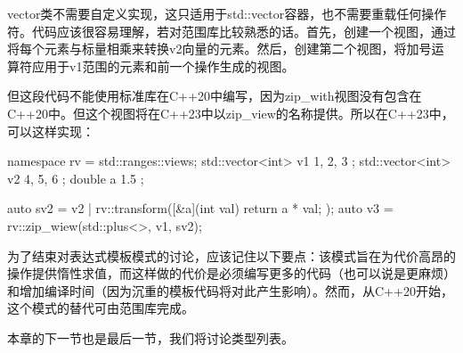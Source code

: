 vector类不需要自定义实现，这只适用于std::vector容器，也不需要重载任何操作符。代码应该很容易理解，若对范围库比较熟悉的话。首先，创建一个视图，通过将每个元素与标量相乘来转换v2向量的元素。然后，创建第二个视图，将加号运算符应用于v1范围的元素和前一个操作生成的视图。

但这段代码不能使用标准库在C++20中编写，因为zip\_with视图没有包含在C++20中。但这个视图将在C++23中以zip\_view的名称提供。所以在C++23中，可以这样实现：

\begin{cpp}
namespace rv = std::ranges::views;
std::vector<int> v1{ 1, 2, 3 };
std::vector<int> v2{ 4, 5, 6 };
double a { 1.5 };

auto sv2 = v2 |
           rv::transform([&a](int val) {return a * val; });
auto v3 = rv::zip_wiew(std::plus<>{}, v1, sv2);
\end{cpp}

为了结束对表达式模板模式的讨论，应该记住以下要点：该模式旨在为代价高昂的操作提供惰性求值，而这样做的代价是必须编写更多的代码（也可以说是更麻烦）和增加编译时间（因为沉重的模板代码将对此产生影响）。然而，从C++20开始，这个模式的替代可由范围库完成。

本章的下一节也是最后一节，我们将讨论类型列表。













